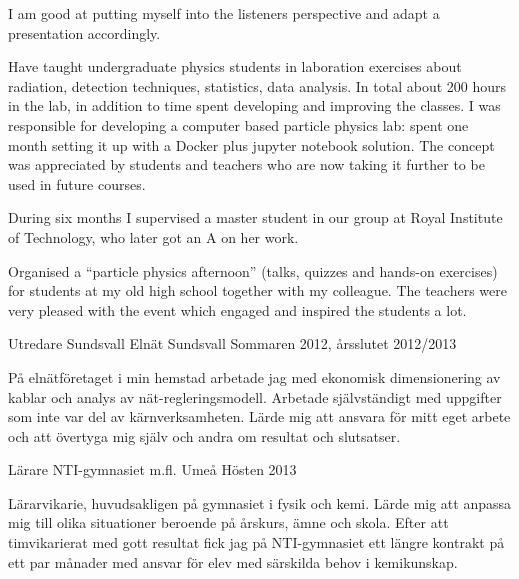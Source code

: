 \begin{cventries}
{\begin{cvitems}
{	I am good at putting myself into the listeners perspective and adapt a presentation accordingly.
}
\item {Have taught undergraduate physics students in laboration exercises about radiation, detection techniques, statistics, data analysis. 
       In total about 200 hours in the lab, in addition to time spent developing and improving the classes.
       I was responsible for developing a computer based particle physics lab: spent one month setting it up with a Docker plus jupyter notebook solution.
       The concept was appreciated by students and teachers who are now taking it further to be used in future courses.
}
\item {During six months I supervised a master student in our group at Royal Institute of Technology, who later got an A on her work.
}
\item {Organised a ``particle physics afternoon'' (talks, quizzes and hands-on exercises) for students at my old high school together with my colleague.
         The teachers were very pleased with the event which engaged and inspired the students a lot.
}
\end{cvitems}
}



\cventry
{Utredare} %
{Sundsvall Eln\"{a}t} %
{Sundsvall} %
{Sommaren 2012, {\aa}rsslutet 2012/2013} %
{ %
\begin{cvitems}
\item {P{\aa} eln{\"a}tf{\"o}retaget i min hemstad arbetade jag med ekonomisk dimensionering av kablar och analys av n{\"a}t-regleringsmodell.
		Arbetade sj{\"a}lvst{\"a}ndigt med uppgifter som inte var del av k{\"a}rnverksamheten.
		L{\"a}rde mig att ansvara f{\"o}r mitt eget arbete och att {\"o}vertyga mig sj{\"a}lv och andra om resultat och slutsatser.}
\end{cvitems}
}


\cventry
{L{\"a}rare} %
{NTI-gymnasiet m.fl.} %
{Ume{\aa}} %
{H{\"o}sten 2013} %
{ %
\begin{cvitems}
\item {L{\"a}rarvikarie, huvudsakligen p{\aa} gymnasiet i fysik och kemi. L{\"a}rde mig att anpassa mig till olika situationer beroende p{\aa} {\aa}rskurs, {\"a}mne och skola. 
			Efter att timvikarierat med gott resultat fick jag p{\aa} NTI-gymnasiet ett l{\"a}ngre kontrakt p{\aa} ett par m{\aa}nader med ansvar f{\"o}r elev med s{\"a}rskilda behov i kemikunskap. }
\end{cvitems}
}


\end{cventries}

